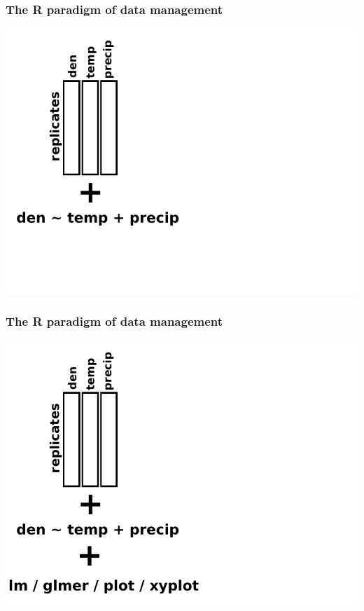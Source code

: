 \documentclass{beamer}
\numberwithin{exercise}{section}
\begin{document}
\begin{frame}
\frametitle{The R paradigm of data management}
\begin{center}
\includegraphics[scale=0.6]{dataframe2function2}
\end{center}
\end{frame}

\begin{frame}
\frametitle{The R paradigm of data management}
\begin{center}
\includegraphics[scale=0.6]{dataframe2function3}
\end{center}
\end{frame}
\end{document}
